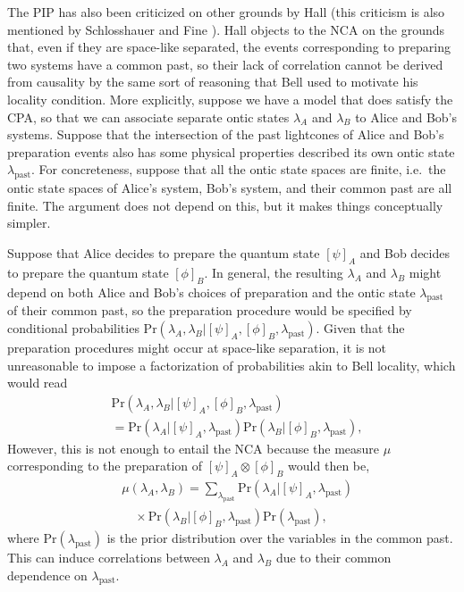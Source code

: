 \documentclass[DIV=calc,paper=a4,fontsize=11pt,twocolumn]{scrartcl} %
\theoremstyle{definition}
\theoremstyle{plain}
\newcommand{\Proj}[1]{\ensuremath{\left [ #1 \right ]}}
\begin{document}
\label{CNCA}

The PIP has also been criticized on other grounds by Hall
\cite{Hall2011} (this criticism is also mentioned by Schlosshauer and
Fine \cite{Schlosshauer2012}).  Hall objects to the NCA on the grounds
that, even if they are space-like separated, the events corresponding
to preparing two systems have a common past, so their lack of
correlation cannot be derived from causality by the same sort of
reasoning that Bell used to motivate his locality condition.  More
explicitly, suppose we have a model that does satisfy the CPA, so that
we can associate separate ontic states $\lambda_A$ and $\lambda_B$ to
Alice and Bob's systems.  Suppose that the intersection of the past
lightcones of Alice and Bob's preparation events also has some
physical properties described its own ontic state
$\lambda_{\text{past}}$.  For concreteness, suppose that all the ontic
state spaces are finite, i.e.\ the ontic state spaces of Alice's
system, Bob's system, and their common past are all finite.  The
argument does not depend on this, but it makes things conceptually
simpler.

Suppose that Alice decides to prepare the quantum state
$\Proj{\psi}_A$ and Bob decides to prepare the quantum state
$\Proj{\phi}_B$.  In general, the resulting $\lambda_A$ and
$\lambda_B$ might depend on both Alice and Bob's choices of
preparation and the ontic state $\lambda_{\text{past}}$ of their
common past, so the preparation procedure would be specified by
conditional probabilities
$\text{Pr}(\lambda_A,\lambda_B|\Proj{\psi}_A,\Proj{\phi}_B,\lambda_{\text{past}})$.
Given that the preparation procedures might occur at space-like
separation, it is not unreasonable to impose a factorization of
probabilities akin to Bell locality, which would read
\begin{align}
&\text{Pr}(\lambda_A,\lambda_B|\Proj{\psi}_A,\Proj{\phi}_B,\lambda_{\text{past}})\nonumber\\
&= \text{Pr}(\lambda_A|\Proj{\psi}_A,\lambda_{\text{past}})
\text{Pr}(\lambda_B|\Proj{\phi}_B, \lambda_{\text{past}}),
\end{align}
However, this is not enough to entail the NCA because the measure
$\mu$ corresponding to the preparation of $\Proj{\psi}_A \otimes
\Proj{\phi}_B$ would then be,
\begin{align}
&\mu(\lambda_A,\lambda_B) = \sum_{\lambda_{\text{past}}}
\text{Pr}(\lambda_A|\Proj{\psi}_A, \lambda_{\text{past}})\nonumber\\
&\quad\times\text{Pr}(\lambda_B|\Proj{\phi}_B, \lambda_{\text{past}})
\text{Pr}(\lambda_{\text{past}}),
\end{align}
where $\text{Pr}(\lambda_{\text{past}})$ is the prior distribution
over the variables in the common past.  This can induce correlations
between $\lambda_A$ and $\lambda_B$ due to their common dependence on
$\lambda_{\text{past}}$.
\end{document}
